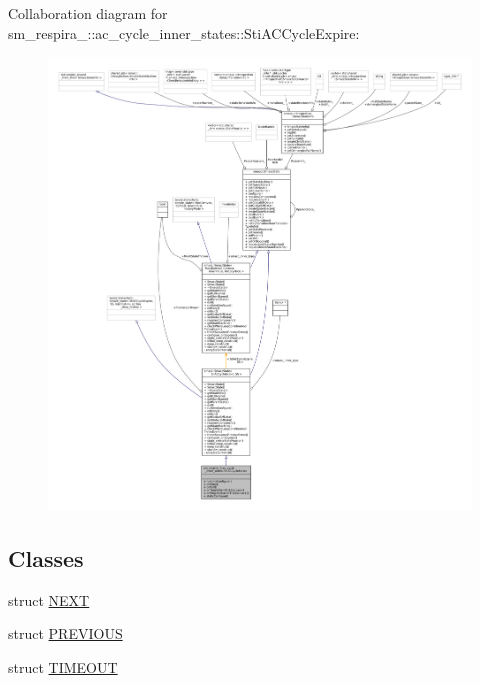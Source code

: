 Collaboration diagram for sm\+\_\+respira\+\_\+:\+:ac\+\_\+cycle\+\_\+inner\+\_\+states\+:\+:Sti\+A\+C\+Cycle\+Expire\+:
\nopagebreak
\begin{figure}[H]
\begin{center}
\leavevmode
\includegraphics[width=350pt]{structsm__respira__1_1_1ac__cycle__inner__states_1_1StiACCycleExpire__coll__graph}
\end{center}
\end{figure}
\subsection*{Classes}
\begin{DoxyCompactItemize}
\item 
struct \hyperlink{structsm__respira__1_1_1ac__cycle__inner__states_1_1StiACCycleExpire_1_1NEXT}{N\+E\+XT}
\item 
struct \hyperlink{structsm__respira__1_1_1ac__cycle__inner__states_1_1StiACCycleExpire_1_1PREVIOUS}{P\+R\+E\+V\+I\+O\+US}
\item 
struct \hyperlink{structsm__respira__1_1_1ac__cycle__inner__states_1_1StiACCycleExpire_1_1TIMEOUT}{T\+I\+M\+E\+O\+UT}
\end{DoxyCompactItemize}
